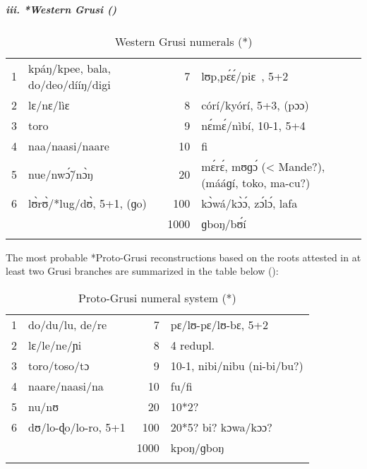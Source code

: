 \clearpage
\subparagraph{iii. *Western Grusi ()}

\begin{table}
\caption{\label{tab:3:176}Western Grusi numerals (*)}


\begin{tabularx}{\textwidth}{llrQ}
\lsptoprule

{1} & kpáŋ/kpee, bala, do/deo/dííŋ/digi & {7} & lʊp,p{\'{ɛ}}{\'{ɛ}}/piɛ~, 5+2\\
{2} & lɛ/nɛ/lìɛ & {8} & córí/kyórí, 5+3, (pɔɔ)\\
{3} & toro & {9} & n{\'{ɛ}}m{\'{ɛ}}/nìbí, 10-1, 5+4\\
{4} & naa/naasi/naare & {10} & fi\\
{5} & nue/nw{\'{\~ɔ}}/n{\`{ɔ}}ŋ & {20} & m{\'{ɛ}}r{\'{ɛ}}, mʊɡ{\'{ɔ}} (< Mande?), (mááɡí, toko, ma-cu?)\\
{6} & l{\`{ʊ}}r{\`{ʊ}}/*lug/d{\`{ʊ}}, 5+1, (ɡo) & {100} & k{\`{ɔ}}wá/k{\`{ɔ}}{\'{ɔ}}, z{\'{ɔ}}l{\'{ɔ}}, lafa\\
&  & {1000} & ɡboŋ/b{\'{ʊ}}í\\
\lspbottomrule
\end{tabularx}
\end{table}

The most probable *Proto-Grusi reconstructions based on the roots attested in at least two Grusi branches are summarized in the table below ():

\begin{table}
\caption{\label{tab:3:177}Proto-Grusi numeral system (*)}


\begin{tabularx}{\textwidth}{lXrX}
\lsptoprule

{1} & do/du/lu, de/re & {7} & pɛ/lʊ-pɛ/lʊ-bɛ, 5+2\\
{2} & lɛ/le/ne/ɲi & {8} & 4 redupl.\\
{3} & toro/toso/tɔ & {9} & 10-1, nibi/nibu (ni-bi/bu?)\\
{4} & naare/naasi/na & {10} & fu/fi\\
{5} & nu/nʊ & {20} & 10*2?\\
{6} & dʊ/lo-ɖo/lo-ro, 5+1 & {100} & 20*5? bi? kɔwa/kɔɔ?\\
&  & {1000} & kpoŋ/ɡboŋ\\
\lspbottomrule
\end{tabularx}
\end{table}

